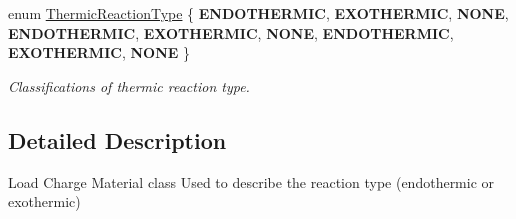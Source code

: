 \begin{DoxyCompactItemize}
\item 
\mbox{\label{namespace_load_charge_material_a51d4263e865a5d86236622dd3fe23fd1}} 
enum \hyperlink{namespace_load_charge_material_a51d4263e865a5d86236622dd3fe23fd1}{Thermic\+Reaction\+Type} \{ \newline
{\bfseries E\+N\+D\+O\+T\+H\+E\+R\+M\+IC}, 
{\bfseries E\+X\+O\+T\+H\+E\+R\+M\+IC}, 
{\bfseries N\+O\+NE}, 
{\bfseries E\+N\+D\+O\+T\+H\+E\+R\+M\+IC}, 
\newline
{\bfseries E\+X\+O\+T\+H\+E\+R\+M\+IC}, 
{\bfseries N\+O\+NE}, 
{\bfseries E\+N\+D\+O\+T\+H\+E\+R\+M\+IC}, 
{\bfseries E\+X\+O\+T\+H\+E\+R\+M\+IC}, 
\newline
{\bfseries N\+O\+NE}
 \}\begin{DoxyCompactList}\small\item\em Classifications of thermic reaction type. \end{DoxyCompactList}
\end{DoxyCompactItemize}


\subsection{Detailed Description}
Load Charge Material class Used to describe the reaction type (endothermic or exothermic) 